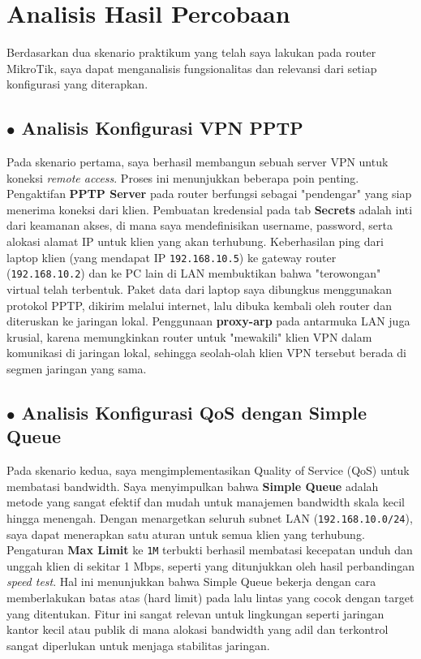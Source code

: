 \section{Analisis Hasil Percobaan}
Berdasarkan dua skenario praktikum yang telah saya lakukan pada router MikroTik, saya dapat menganalisis fungsionalitas dan relevansi dari setiap konfigurasi yang diterapkan.

\subsection*{$\bullet$ Analisis Konfigurasi VPN PPTP}
Pada skenario pertama, saya berhasil membangun sebuah server VPN untuk koneksi \textit{remote access}. Proses ini menunjukkan beberapa poin penting. Pengaktifan \textbf{PPTP Server} pada router berfungsi sebagai "pendengar" yang siap menerima koneksi dari klien. Pembuatan kredensial pada tab \textbf{Secrets} adalah inti dari keamanan akses, di mana saya mendefinisikan username, password, serta alokasi alamat IP untuk klien yang akan terhubung.
Keberhasilan ping dari laptop klien (yang mendapat IP \texttt{192.168.10.5}) ke gateway router (\texttt{192.168.10.2}) dan ke PC lain di LAN membuktikan bahwa "terowongan" virtual telah terbentuk. Paket data dari laptop saya dibungkus menggunakan protokol PPTP, dikirim melalui internet, lalu dibuka kembali oleh router dan diteruskan ke jaringan lokal. Penggunaan \textbf{proxy-arp} pada antarmuka LAN juga krusial, karena memungkinkan router untuk "mewakili" klien VPN dalam komunikasi di jaringan lokal, sehingga seolah-olah klien VPN tersebut berada di segmen jaringan yang sama.

\subsection*{$\bullet$ Analisis Konfigurasi QoS dengan Simple Queue}
Pada skenario kedua, saya mengimplementasikan Quality of Service (QoS) untuk membatasi bandwidth. Saya menyimpulkan bahwa \textbf{Simple Queue} adalah metode yang sangat efektif dan mudah untuk manajemen bandwidth skala kecil hingga menengah. Dengan menargetkan seluruh subnet LAN (\texttt{192.168.10.0/24}), saya dapat menerapkan satu aturan untuk semua klien yang terhubung.
Pengaturan \textbf{Max Limit} ke \texttt{1M} terbukti berhasil membatasi kecepatan unduh dan unggah klien di sekitar 1 Mbps, seperti yang ditunjukkan oleh hasil perbandingan \textit{speed test}. Hal ini menunjukkan bahwa Simple Queue bekerja dengan cara memberlakukan batas atas (hard limit) pada lalu lintas yang cocok dengan target yang ditentukan. Fitur ini sangat relevan untuk lingkungan seperti jaringan kantor kecil atau publik di mana alokasi bandwidth yang adil dan terkontrol sangat diperlukan untuk menjaga stabilitas jaringan.

